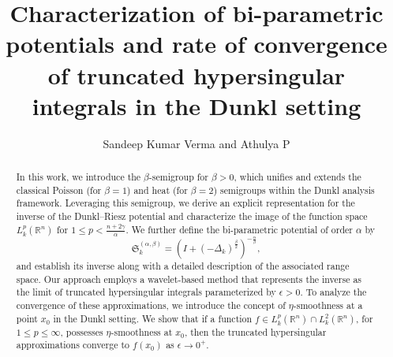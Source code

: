 \documentclass[11pt,a4paper,reqno]{amsproc}
\theoremstyle{definition}
\theoremstyle{remark}
\numberwithin{equation}{section}
\begin{document}
\setcounter{page}{1}

\title[Characterization  of bi-parametric potential associated with the Dunkl Laplacian]
 {Characterization of bi-parametric potentials and rate of convergence of truncated hypersingular integrals in the Dunkl setting}

\author[Sandeep Kumar Verma and Athulya P ]{Sandeep Kumar Verma and Athulya P}

\address{Department of Mathematics, SRM University-AP, Amaravati, Guntur--522240, India}




\begin{abstract}


In this work, we introduce the $\beta$-semigroup for $\beta > 0$, which unifies and extends the classical Poisson (for $\beta=1$) and heat (for $\beta=2$) semigroups within the Dunkl analysis framework. Leveraging this semigroup, we derive an explicit representation for the inverse of the Dunkl–Riesz potential and characterize the image of the function space $L_k^p(\mathbb{R}^n)$ for $1 \leq p < \frac{n + 2\gamma}{\alpha}$. We further define the bi-parametric potential of order $\alpha$ by
\[
\mathfrak{S}_k^{(\alpha,\beta)} = \left(I + (-\Delta_k)^{\frac{\beta}{2}}\right)^{-\frac{\alpha}{\beta}},
\]
and establish its inverse along with a detailed description of the associated range space. Our approach employs a wavelet-based method that represents the inverse as the limit of truncated hypersingular integrals parameterized by $\epsilon > 0$. To analyze the convergence of these approximations, we introduce the concept of $\eta$-smoothness at a point $x_0$ in the Dunkl setting. We show that if a function $f \in L_k^p(\mathbb{R}^n) \cap L_k^2(\mathbb{R}^n)$, for $1 \leq p \leq \infty$, possesses $\eta$-smoothness at $x_0$, then the truncated hypersingular approximations converge to $f(x_0)$ as $\epsilon \to 0^+$.
\end{abstract}
\maketitle
\end{document}
